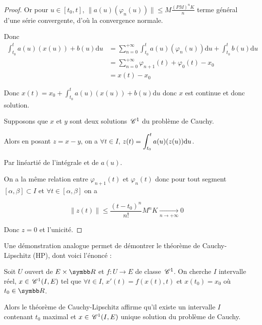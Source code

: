 \begin{proof}
    Or pour $u \in [t_0, t]$, $\| a(u)(\varphi_n(u)) \| \leqslant M \frac{(PM)^nK}{n}$ terme général d'une 
    série convergente, d'où la convergence normale. 

    Donc 
    \begin{align}
        \int_{t_0}^{t} a(u)(x(u)) + b(u) \mathrm d u & = \sum_{n = 0}^{+ \infty} \int_{t_0}^{t} a(u)(\varphi_n(u)) \mathrm d u + \int_{t_0}^{t} b(u) \mathrm d u \\
        & = \sum_{n = 0}^{+ \infty} \varphi_{n + 1}(t) + \varphi_0(t) - x_0 \\
        & = x(t) - x_0
    \end{align}

    Donc $x(t) = x_0 + \int_{t_0}^{t} a(u)(x(u)) + b(u) \mathrm d u$ donc $x$ est continue et donc 
    solution. 


    \lvspace {}

    \svspace Supposons que $x$ et $y$ sont deux solutions $\,\mathscr C^{1}$ du problème de Cauchy.

    Alors en posant $z = x - y$, on a $\forall t \in I$, $z(t) = \displaystyle \int_{t_0}^{t} a(u)(z(u)) \mathrm d u$.

    Par linéartié de l'intégrale et de $a(u)$. 

    On a la même relation entre $\varphi_{n + 1}(t)$ et $\varphi_n(t)$ donc pour tout 
    segment $[\alpha, \beta] \subset I$ et 
    $\forall t \in [\alpha, \beta]$ on a 
    
    $$\| z(t) \| \leqslant \frac{(t - t_0)^n}{n!}M^nK \xrightarrow[n \to + \infty]{} 0$$

    Donc $z = 0$ et l'unicité. 
\end{proof}

\begin{remarque}
    Une démonstration analogue permet de démontrer le théorème de Cauchy-Lipschitz (HP), dont voici l'énoncé :

    Soit $U$ ouvert de $E \times \R$ et $f : U \to E$ de classe $\,\mathscr C^{1}$. On cherche 
    $I$ intervalle réel, $x \in \,\mathscr C^{1} (I, E)$ tel que $\forall t \in I$, 
    $x'(t) = f(x(t), t)$ et $x(t_0) = x_0$ où $t_0 \in \R$. 

    Alors le théorème de Cauchy-Lipschitz affirme qu'il existe un intervalle $I$ contenant 
    $t_0$ maximal 
    et $x \in \,\mathscr C^{1} (I, E)$ unique solution du problème de Cauchy.
\end{remarque}

